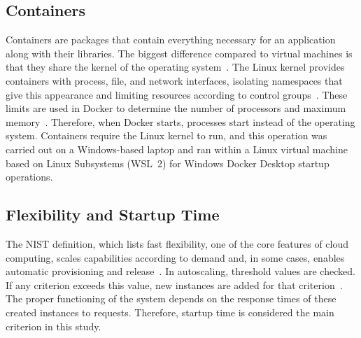 \documentclass[conference,a4paper]{IEEEtran}
\begin{document}
\subsection{Containers}
Containers are packages that contain everything necessary for an application along with their libraries. The biggest difference compared to virtual machines is that they share the kernel of the operating system~\cite{b5}. The Linux kernel provides containers with process, file, and network interfaces, isolating namespaces that give this appearance and limiting resources according to control groups~\cite{b3}. These limits are used in Docker to determine the number of processors and maximum memory~\cite{b3}. Therefore, when Docker starts, processes start instead of the operating system. Containers require the Linux kernel to run, and this operation was carried out on a Windows-based laptop and ran within a Linux virtual machine based on Linux Subsystems (WSL~2) for Windows Docker Desktop startup operations.

\subsection{Flexibility and Startup Time}
The NIST definition, which lists fast flexibility, one of the core features of cloud computing, scales capabilities according to demand and, in some cases, enables automatic provisioning and release~\cite{b1}. In autoscaling, threshold values are checked. If any criterion exceeds this value, new instances are added for that criterion~\cite{b2}. The proper functioning of the system depends on the response times of these created instances to requests. Therefore, startup time is considered the main criterion in this study.
\end{document}
